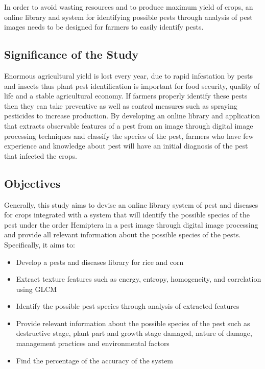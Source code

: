\documentclass[journal]{./IEEE/IEEEtran}
\begin{document}
In order to avoid wasting resources and to produce maximum yield of crops, an online library and system for identifying possible pests through analysis of pest images needs to be designed for farmers to easily identify pests.\cite{article_kandalkar2}


\subsection{Significance of the Study}
Enormous agricultural yield is lost every year, due to rapid infestation by pests and insects thus plant pest identification is important for food security, quality of life and a stable agricultural economy. If farmers properly identify these pests then they can take preventive as well as control measures such as spraying pesticides to increase production.\cite{article_kandalkar3} By developing an online library and application that extracts observable features of a pest from an image through digital image processing techniques and classify the species of the pest, farmers who have few experience and knowledge about pest will have an initial diagnosis of the pest that infected the crops. 


\subsection{Objectives}
Generally, this study aims to devise an online library system of pest and diseases for crops integrated with a system that will identify the possible species of the pest under the order Hemiptera in a pest image through digital image processing and provide all relevant information about the possible species of the pests. Specifically, it aims to:
\pubidadjcol
	\begin{itemize}
	\item Develop a pests and diseases library for rice and corn
	\item Extract texture features such as energy, entropy, homogeneity, and correlation using GLCM
    \item Identify the possible pest species through analysis of extracted features
	\item Provide relevant information about the possible species of the pest  such as destructive stage, plant part and growth stage damaged, nature of damage, management practices and environmental factors
	\item Find the percentage of the accuracy of the system
	\end{itemize}
\end{document}
